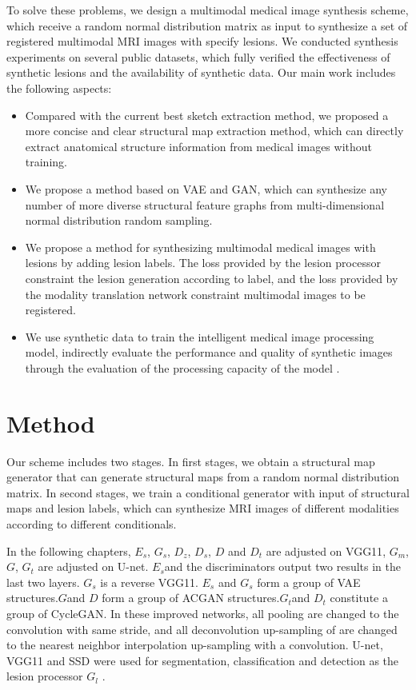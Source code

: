 \documentclass[runningheads]{llncs}
\begin{document}
	To solve these problems, we design a multimodal medical image synthesis scheme, which receive a random normal distribution matrix as input to synthesize a set of registered multimodal MRI images with specify lesions. We conducted synthesis experiments on several public datasets, which fully verified the effectiveness of synthetic lesions and the availability of synthetic data. Our main work includes the following aspects:
	\begin{itemize}
		\item Compared with the current best sketch extraction method, we proposed a more concise and clear structural map extraction method, which can directly extract anatomical structure information from medical images without training.
		
		\item We propose a method based on VAE and GAN, which can synthesize any number of more diverse structural feature graphs from multi-dimensional normal distribution random sampling.
		
		\item We propose a method for synthesizing multimodal medical images with lesions by adding lesion labels. The loss provided by the lesion processor constraint the lesion generation according to label, and the loss provided by the modality translation network constraint multimodal images to be registered.
		
		\item We use synthetic data to train the intelligent medical image processing model, indirectly evaluate the performance and quality of synthetic images through the evaluation of the processing capacity of the model .
	\end{itemize}
	
	\section{Method}
	\label{method}
	Our scheme includes two stages. In first stages, we obtain a structural map generator that can generate structural maps from a random normal distribution matrix. In second stages, we train a conditional generator with input of structural maps and lesion labels, which can synthesize MRI images of different modalities according to different conditionals.
	
	In the following chapters, $E_s $, $G_s$, $D_{z} $, $D_{s} $, $D $ and $D_{t}$ are adjusted on VGG11\cite{102simonyan2014very}, $G_m $, $G$, $G_t$ are adjusted on U-net\cite{6zhu2017unpaired}. $E_s$and the discriminators output two results in the last two layers. $G_s$ is a reverse VGG11. $E_s $ and $G_s$ form a group of VAE\cite{88rezende2014stochastic} structures.$G$and $D$ form a group of ACGAN\cite{98odena2016conditional} structures.$G_t$and $D_t $ constitute a group of CycleGAN. In these improved networks, all pooling are changed to the convolution with same stride, and all deconvolution up-sampling of are changed to the nearest neighbor interpolation up-sampling with a convolution. U-net, VGG11 and SSD\cite{109liu2016ssd:} were used for segmentation, classification and detection as the lesion processor $G_l$ .
\end{document}
